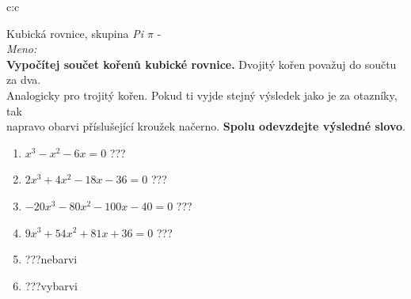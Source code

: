 \documentclass[10pt]{report}
\begin{document}
\clearpage
\thispagestyle{empty}
\begin{tabular}{c:c}
\begin{minipage}[c][99mm][t]{0.49\linewidth}
\begin{center}
\vspace{7mm}
{\huge Kubická rovnice, skupina \textit{Pi $\pi$} -}\\[4.5mm]
\textit{Meno:}\phantom{xxxxxxxxxxxxxxxxxxxxxxxxxxxxxxxxxxxxxxxxxxxxxxxxxxxxxxxxxxxxxxxxx}\\[3.5mm]
\textbf{Vypočítej součet kořenů kubické rovnice.} Dvojitý kořen považuj do součtu za dva.\\Analogicky pro trojitý kořen. Pokud ti vyjde stejný výsledek jako je za otazníky, tak\\napravo obarvi příslušející kroužek načerno. \textbf{Spolu odevzdejte výsledné slovo}.\\[3mm]
\begin{minipage}{0.77\linewidth}
\begin{center}
\begin{varwidth}{\textwidth}
\begin{enumerate}
\large
\item $x^3-x^2-6x=0$\quad \dotfill\; ???\;\dotfill {}
\item $2x^3+4x^2-18x-36=0$\quad \dotfill\; ???\;\dotfill {}
\item $-20x^3-80x^2-100x-40=0$\quad \dotfill\; ???\;\dotfill {}
\item $9x^3+54x^2+81x+36=0$\quad \dotfill\; ???\;\dotfill {}
\item \quad \dotfill\; ???\;\dotfill \quad nebarvi
\item \quad \dotfill\; ???\;\dotfill \quad vybarvi
\end{enumerate}
\end{varwidth}
\end{center}
\end{minipage}
\begin{minipage}{0.20\linewidth}
\begin{center}

\end{center}
\end{minipage}
\end{center}
\end{minipage}
\end{tabular}
\end{document}

